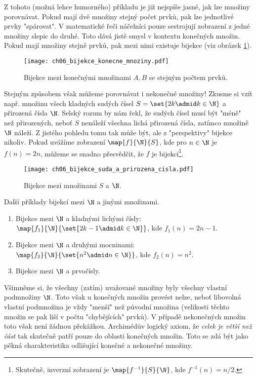 Z tohoto (možná lehce humorného) příkladu je již nejspíše jasné, jak lze množiny porovnávat. Pokud mají dvě množiny stejný počet prvků, pak lze jednotlivé prvky "spárovat". V matematické řeči náčelníci pouze sestrojují zobrazení z jedné množiny slepic do druhé. Toto dává jistě smysl v kontextu konečných množin. Pokud mají množiny stejně prvků, pak mezi nimi existuje bijekce (viz obrázek \ref{fig:bijekce_konecne_mnoziny}).
\begin{figure}[h]
    \centering
    \texttt{[image: ch06\_bijekce\_konecne\_mnoziny.pdf]}
    \caption{Bijekce mezi konečnými množinami $A,B$ se stejným počtem prvků.}
    \label{fig:bijekce_konecne_mnoziny}
\end{figure}
Stejným způsobem však můžeme porovnávat i nekonečné množiny! Zkusme si vzít např. množinu všech kladných sudých čísel $S=\set{2k\admid k\in\N}$ a přirozená čísla $\N$. Selský rozum by nám řekl, že sudých čísel musí být "méně" než přirozených, neboť $S$ nenáleží všechna lichá přirozená čísla, zatímco množině $\N$ náleží. Z jistého pohledu tomu tak může být, ale z "perspektivy" bijekce nikoliv. Pokud uvážíme zobrazení $\map{f}{\N}{S}$, kde pro $n\in\N$ je $f(n)=2n$, můžeme se snadno přesvědčit, že $f$ je bijekcí\footnote{Skutečně, inverzní zobrazení je $\map{f^{-1}}{S}{\N}$, kde $f^{-1}(n)=n/2$.}.
\begin{figure}[h]
    \centering
    \texttt{[image: ch06\_bijekce\_suda\_a\_prirozena\_cisla.pdf]}
    \caption{Bijekce mezi množinami $S$ a $\N$.}
    \label{fig:bijekce_suda_a_prirozena_cisla}
\end{figure}
\begin{example}\label{ex:bijekce_prirozena_cisla}
    Další příklady bijekcí mezi $\N$ a jinými množinami.
    \begin{enumerate}[label=(\roman*)]
        \item Bijekce mezi $\N$ a kladnými lichými čísly: $\map{f_1}{\N}{\set{2k-1\admid k\in\N}}$, kde $f_1(n)=2n-1$.
        \item Bijekce mezi $\N$ a druhými mocninami: $\map{f_2}{\N}{\set{n^2\admid n\in\N}}$, kde $f_2(n)=n^2$.
        \item Bijekce mezi $\N$ a prvočísly.
    \end{enumerate}
\end{example}
Všimněme si, že všechny (zatím) uvažované množiny byly všechny vlastní podmnožiny $\N$. Toto však u konečných množin provést nelze, neboť libovolná vlastní podmnožina je vždy "menší" než původní množina (velikosti těchto množin se pak liší v počtu "chybějících" prvků). V případě nekonečných množin toto však není žádnou překážkou. Archimédův logický axiom, že \emph{celek je větší než část} tak skutečně patří pouze do oblasti konečných množin. Toto se zdá být jako pěkná charakteristika odlišující konečné a nekonečné množiny.\par
